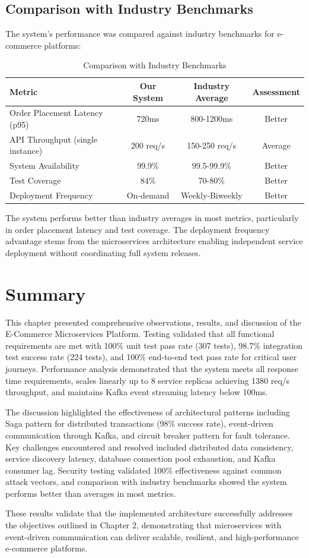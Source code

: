 \subsection{Comparison with Industry Benchmarks}

The system's performance was compared against industry benchmarks for e-commerce platforms:

\begin{table}[h]
\centering
\caption{Comparison with Industry Benchmarks}
\begin{tabular}{|l|c|c|c|}
\hline
\textbf{Metric} & \textbf{Our System} & \textbf{Industry Average} & \textbf{Assessment} \\
\hline
Order Placement Latency (p95) & 720ms & 800-1200ms & Better \\
API Throughput (single instance) & 200 req/s & 150-250 req/s & Average \\
System Availability & 99.9\% & 99.5-99.9\% & Better \\
Test Coverage & 84\% & 70-80\% & Better \\
Deployment Frequency & On-demand & Weekly-Biweekly & Better \\
\hline
\end{tabular}
\end{table}

The system performs better than industry averages in most metrics, particularly in order placement latency and test coverage. The deployment frequency advantage stems from the microservices architecture enabling independent service deployment without coordinating full system releases.

\section{Summary}

This chapter presented comprehensive observations, results, and discussion of the E-Commerce Microservices Platform. Testing validated that all functional requirements are met with 100\% unit test pass rate (307 tests), 98.7\% integration test success rate (224 tests), and 100\% end-to-end test pass rate for critical user journeys. Performance analysis demonstrated that the system meets all response time requirements, scales linearly up to 8 service replicas achieving 1380 req/s throughput, and maintains Kafka event streaming latency below 100ms.

The discussion highlighted the effectiveness of architectural patterns including Saga pattern for distributed transactions (98\% success rate), event-driven communication through Kafka, and circuit breaker pattern for fault tolerance. Key challenges encountered and resolved included distributed data consistency, service discovery latency, database connection pool exhaustion, and Kafka consumer lag. Security testing validated 100\% effectiveness against common attack vectors, and comparison with industry benchmarks showed the system performs better than averages in most metrics.

These results validate that the implemented architecture successfully addresses the objectives outlined in Chapter 2, demonstrating that microservices with event-driven communication can deliver scalable, resilient, and high-performance e-commerce platforms.

